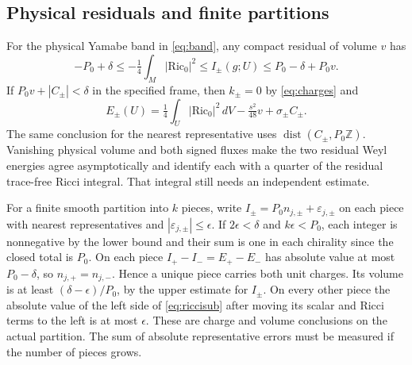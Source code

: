 \documentclass[11pt]{article}
\theoremstyle{remark}
\newcommand{\Ric}{\mathrm{Ric}}
\begin{document}
\subsection{Physical residuals and finite partitions}
For the physical Yamabe band in \eqref{eq:band}, any compact residual of volume \(v\) has
\[
 -P_0+\delta\le -\tfrac14\int_M|\Ric_0|^2
  \le I_\pm(g;U)\le P_0-\delta+P_0v .
\]
If \(P_0v+|C_\pm|<\delta\) in the specified frame, then \(k_\pm=0\) by \eqref{eq:charges} and
\begin{equation}
 E_\pm(U)=\tfrac14\int_U|\Ric_0|^2\,dV-\tfrac{s^2}{48}v+\sigma_\pm C_\pm .
 \label{eq:riccisub}
\end{equation}
The same conclusion for the nearest representative uses \(\operatorname{dist}(C_\pm,P_0\mathbb Z)\). Vanishing physical volume and both signed fluxes make the two residual Weyl energies agree asymptotically and identify each with a quarter of the residual trace-free Ricci integral. That integral still needs an independent estimate.

For a finite smooth partition into \(k\) pieces, write \(I_\pm=P_0n_{j,\pm}+\varepsilon_{j,\pm}\) on each piece with nearest representatives and \(|\varepsilon_{j,\pm}|\le\epsilon\). If \(2\epsilon<\delta\) and \(k\epsilon<P_0\), each integer is nonnegative by the lower bound and their sum is one in each chirality since the closed total is \(P_0\). On each piece \(I_+-I_-=E_+-E_-\) has absolute value at most \(P_0-\delta\), so \(n_{j,+}=n_{j,-}\). Hence a unique piece carries both unit charges. Its volume is at least \((\delta-\epsilon)/P_0\), by the upper estimate for \(I_\pm\). On every other piece the absolute value of the left side of \eqref{eq:riccisub} after moving its scalar and Ricci terms to the left is at most \(\epsilon\). These are charge and volume conclusions on the actual partition. The sum of absolute representative errors must be measured if the number of pieces grows.
\end{document}
